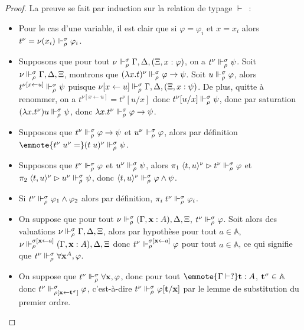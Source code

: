 \documentclass{article}
\begin{document}
\begin{proof}
  La preuve se fait par induction sur la relation de typage $\vdash$~:
  \begin{itemize}
  \item Pour le cas d'une variable, il est clair que si $\varphi = \varphi_i$ et $x = x_i$ alors $t^\nu = \nu(x_i)\Vdash_\rho^\sigma \varphi_i$.
  \item Supposons que pour tout $\nu \Vdash_\rho^\sigma \Gamma,\Delta,(\Xi, x : \varphi)$, on a $t^\nu \Vdash_\rho^\sigma \psi$. Soit $\nu \Vdash_\rho^\sigma \Gamma,\Delta,\Xi$, montrons que $(\lambda x.t)^\nu\Vdash_\rho^\sigma \varphi \to \psi$. Soit $u \Vdash_\rho^\sigma \varphi$, alors $t^{\nu[x \leftarrow u]}\Vdash_\rho^\sigma \psi$ puisque $\nu[x\leftarrow u]\Vdash_\rho^\sigma \Gamma,\Delta,(\Xi, x : \psi)$. De plus, quitte à renommer, on a $t^{\nu[x\leftarrow u]} = t^\nu[u/x]$ donc $t^\nu[u/x]\Vdash_\rho^\sigma \psi$, donc par saturation $(\lambda x.t^\nu) u \Vdash_\rho^\sigma \psi$, donc $\lambda x.t^\nu\Vdash_\rho^\sigma \varphi\to\psi$. 
  \item Supposons que $t^\nu\Vdash_\rho^\sigma \varphi \to \psi$ et $u^\nu\Vdash_\rho^\sigma \varphi$, alors par définition $\emnote{t^\nu\;u^\nu=}(t\;u)^\nu\reali_\rho^\sigma \psi$.
  \item Supposons que $t^\nu\Vdash_\rho^\sigma \varphi$ et $u^\nu\Vdash_\rho^\sigma \psi$, alors $\pi_1\;\langle t,u\rangle^\nu \rhd t^\nu \Vdash_\rho^\sigma \varphi$ et $\pi_2\;\langle t,u\rangle^\nu\rhd u^\nu \Vdash_\rho^\sigma \psi$, donc $\langle t,u\rangle^\nu \Vdash_\rho^\sigma \varphi\land\psi$.
  \item Si $t^\nu \Vdash_\rho^\sigma \varphi_1\land\varphi_2$ alors par définition, $\pi_i\;t^\nu\Vdash_\rho^\sigma \varphi_i$.
  \item On suppose que pour tout $\nu\Vdash_\rho^\sigma (\Gamma, \mathbf{x} : A), \Delta,\Xi$, $t^\nu\Vdash_\rho^\sigma \varphi$. Soit alors des valuations $\nu\Vdash_\rho^\sigma \Gamma,\Delta,\Xi$, alors par hypothèse pour tout $a \in \mathbb A$, $\nu\Vdash_\rho^{\sigma[\mathbf{x}\leftarrow a]}(\Gamma, \mathbf{x} : A), \Delta, \Xi$ donc $t^\nu\Vdash_\rho^{\sigma[\mathbf{x} \leftarrow a]}\varphi$ pour tout $a\in \mathbb A$, ce qui signifie que $t^\nu \Vdash_\rho^\sigma \forall \mathbf{x}^A, \varphi$.
  \item On suppose que $t^\nu\Vdash_\rho^\sigma \forall \mathbf{x}, \varphi$, donc pour tout $\emnote{\Gamma \vdash ?}\bt : A$, $\mathbf{t}^\sigma \in \mathbb A$ donc $t^\nu\Vdash_{\rho[\mathbf{x}\leftarrow \mathbf{t}^\sigma]}^\sigma \varphi$, c'est-à-dire $t^\nu\Vdash_\rho^\sigma \varphi[\mathbf{t}/\mathbf{x}]$ par le lemme de substitution du premier ordre.

\end{itemize}
\end{proof}
\end{document}
